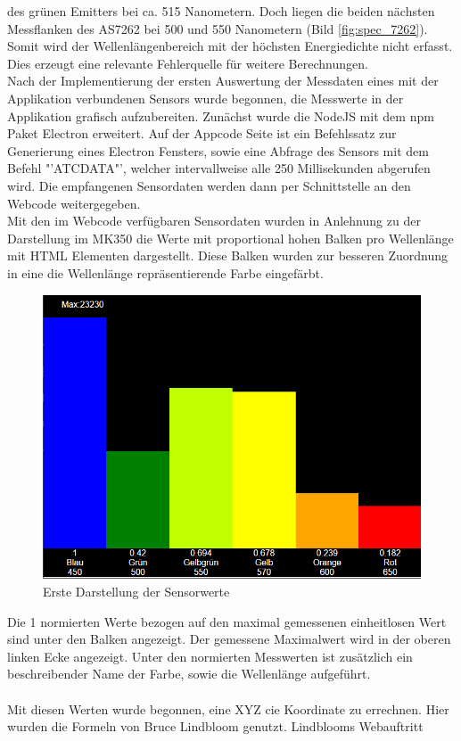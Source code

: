 \documentclass[11pt]{scrartcl}
\begin{document}
des grünen Emitters bei ca. 515 Nanometern. Doch liegen die beiden nächsten Messflanken des AS7262 bei 500 und 550 Nanometern (Bild \ref{fig:spec_7262}).
Somit wird der Wellenlängenbereich mit der höchsten Energiedichte nicht erfasst. Dies erzeugt eine relevante Fehlerquelle für weitere
Berechnungen.\\
Nach der Implementierung der ersten Auswertung der Messdaten eines mit der Applikation verbundenen Sensors wurde begonnen, die Messwerte in der
Applikation grafisch aufzubereiten. Zunächst wurde die NodeJS mit dem \ac{npm} Paket Electron erweitert. Auf der Appcode Seite ist ein Befehlssatz
zur Generierung eines Electron Fensters, sowie eine Abfrage des Sensors mit dem Befehl "'ATCDATA"', welcher intervallweise alle 250 Millisekunden
abgerufen wird. Die empfangenen Sensordaten werden dann per Schnittstelle an den Webcode weitergegeben.\\
Mit den im Webcode verfügbaren Sensordaten wurden in Anlehnung zu der Darstellung im MK350 die Werte mit proportional hohen Balken pro Wellenlänge
mit HTML Elementen dargestellt. Diese Balken wurden zur besseren Zuordnung in eine die Wellenlänge repräsentierende Farbe eingefärbt.
\begin{figure}[H]
    \begin{center}
        \includegraphics[width=.6\textwidth]{images/app_dummy_spectrum.png}
    \end{center}
    \caption{Erste Darstellung der Sensorwerte}
\end{figure}
\noindent
Die 1 normierten Werte bezogen auf den maximal gemessenen einheitlosen Wert sind unter den Balken angezeigt. Der gemessene Maximalwert wird in der
oberen linken Ecke angezeigt. Unter den normierten Messwerten ist zusätzlich ein beschreibender Name der Farbe, sowie die Wellenlänge aufgeführt.\\
\\
Mit diesen Werten wurde begonnen, eine XYZ \ac{cie} Koordinate zu errechnen. Hier wurden die Formeln von Bruce Lindbloom genutzt. Lindblooms Webauftritt
\end{document}
